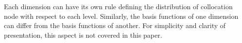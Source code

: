 \begin{remark}
Each dimension can have its own rule defining the distribution of collocation
node with respect to each level. Similarly, the basis functions of one dimension
can differ from the basis functions of another. For simplicity and clarity of
presentation, this aspect is not covered in this paper.
\end{remark}
